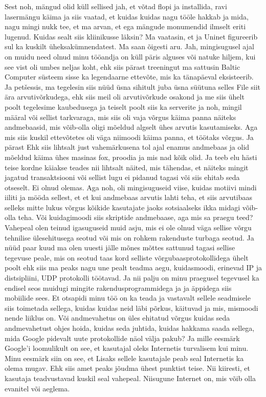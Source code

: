 Sest noh, mängud olid küll sellised jah, et võtad flopi ja installida, ravi lasermängu käima ja siis vaatad, et kuidas kuidas nagu tööle hakkab ja mida, nagu mingi nukk tee, et ma arvan, et ega mängude monumendid ilmselt eriti lugenud.
Kuidas sealt siis kliinikusse läksin? Ma vaatasin, et ja Uninet figureerib sul ka kuskilt üheksakümnendatest. Ma saan õigesti aru.
Jah, mingisugusel ajal on muidu need olnud minu tööandja on küll päris alguses või natuke hiljem, kui see vist oli umbes neljas koht, ehk siis pärast treeningut ma sattusin Baltic Computer süsteem sisse ka legendaarne ettevõte, mis ka tänapäeval eksisteerib. Ja petšessis, ma tegelesin siis nüüd üsna sihitult juba üsna süütuna selles File siit ära arvutivõrkudega, ehk siis meil oli arvutivõrkude osakond ja me siis ühelt poolt tegelesime kaubedusega ja teiselt poolt siis ka serverite ja noh, mingil määral või sellist tarkvaraga, mis siis oli vaja võrgus käima panna näiteks andmebaasid, mis võib-olla oligi mõeldud algselt ühes arvutis kasutamiseks. Aga mis siis kuskil ettevõtetes oli väga niimoodi käima panna, et töötaks võrgus. Ja pärast
Ehk siis lihtsalt just vahemärkusena tol ajal enamus andmebaas ja olid mõeldud käima ühes masinas fox, proodia ja mis nad kõik olid. Ja teeb elu hästi teise kordne käiakse teades nii lihtsalt näited, mis tähendas, et näiteks mingit jagatud transaktsiooni või sellist lugu ei pidanud tagasi või siis ehitab seda otseselt.
Ei olnud olemas.
Aga noh, oli mingisuguseid viise, kuidas motiivi mindi iiliti ja mööda sellest, et et kui andmebaas arvutis lahti teha, et siis arvutibaas selleks mitte lukus võrgus kõikide kasutajate jaoks sotsiaalseks ikka midagi võib-olla teha. Või kuidagimoodi siis skriptide andmebaase, aga mis sa praegu teed? Vahepeal olen teinud igasuguseid muid asju, mis ei ole olnud väga sellise võrgu tehnilise ülesehitusega seotud või mis on rohkem rakenduste turbaga seotud. Ja nüüd paar kuud ma olen uuesti jälle mõnes mõttes sattunud tagasi sellise tegevuse peale, mis on seotud taas kord selliste võrgubaasprotokollidega ühelt poolt ehk siis ma peaks nagu une pealt teadma aegu, kuidasmoodi, erinevad IP ja distsipliini, UDP protokolli töötavad. Ja nii palju on minu praegusel tegevusel ka endisel seos muidugi mingite rakendusprogrammidega ja ja äppidega siis mobiilide sees. Et otsapidi minu töö on ka teada ja vastavalt sellele seadmisele siis toimetada sellega, kuidas kuidas neid läbi põrkus, käituvad ja mis, mismoodi nende liiklus on. Või andmevahetus on üles ehitatud võrgus kuidas seda andmevahetust ohjes hoida, kuidas seda juhtida, kuidas hakkama saada sellega, mida Google pidevalt uute protokollide näol välja pakub? Ja mille eesmärk Google'i loomulikult on see, et kasutajal oleks Internetis turvalisem kui minu. Minu eesmärk siin on see, et Lisaks sellele kasutajale peab seal Internetis ka olema mugav. Ehk siis amet peaks jõudma ühest punktist teise. Nii kiiresti, et kasutaja teadvustavad kuskil seal vahepeal. Niisugune Internet on, mis võib olla evanitel või aeglema.
